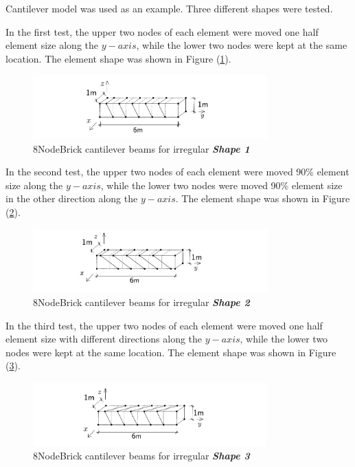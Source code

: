 \documentclass[fleqn,11pt]{article}
\begin{document}
Cantilever model was used as an example. 
Three different shapes were tested. 


In the first test, the upper two nodes of each element were moved one half element size along the $y-axis$, while the lower two nodes were kept at the same location. The element shape was shown in Figure (\ref{fig irregular shape 1 8NodeBrick cantilever beams }).

\begin{figure}[H]
  \centering
  \includegraphics[width=9cm]{../Figure-files/beam_brick_shape1.pdf}
  \caption{8NodeBrick cantilever beams for irregular \textbf{\emph{Shape 1}} }
  \label{fig irregular shape 1 8NodeBrick cantilever beams }
\end{figure}


In the second test, the upper two nodes of each element were moved 90\% element size along the $y-axis$, while the lower two nodes were moved 90\% element size in the other direction along the $y-axis$. The element shape was shown in Figure (\ref{fig irregular shape 2 8NodeBrick cantilever beams }).

\begin{figure}[H]
  \centering
  \includegraphics[width=9cm]{../Figure-files/beam_brick_shape2.pdf}
  \caption{8NodeBrick cantilever beams for irregular \textbf{\emph{Shape 2}} }
  \label{fig irregular shape 2 8NodeBrick cantilever beams }
\end{figure}



In the third test, the upper two nodes of each element were moved one half element size with different directions along the $y-axis$, while the lower two nodes were kept at the same location. The element shape was shown in Figure (\ref{fig irregular shape 3 8NodeBrick cantilever beams }).

\begin{figure}[H]
  \centering
  \includegraphics[width=9cm]{../Figure-files/beam_brick_shape3.pdf}
  \caption{8NodeBrick cantilever beams for irregular \textbf{\emph{Shape 3}} }
  \label{fig irregular shape 3 8NodeBrick cantilever beams }
\end{figure}
\end{document}
